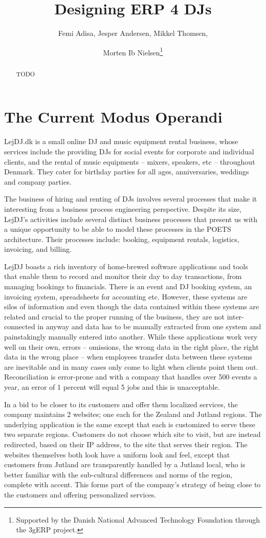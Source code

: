 \documentclass[envcountsame]{llncs}
\title{Designing ERP 4 DJs}
\author{Femi Adisa\inst{1}, Jesper Andersen\inst{2}, Mikkel Thomsen\inst{2}, \and Morten Ib Nielsen\inst{2}\thanks{Supported by the Danish National
    Advanced Technology Foundation through the 3gERP project.}}
\institute{Center for Applied ICT, Copenhagen Business School\\Solbjerg Plads 3 DK-2000,
  Frederiksberg Denmark\and 
  Department of Computer Science, University of Copenhagen\\
  Universitetsparken 1 DK-2100, Copenhagen Denmark\\
  \email{fa.caict@cbs.dk, jespera@diku.dk, jonsson@diku.dk, mortenib@diku.dk}}
\begin{document}
\pagestyle{plain}
\maketitle
\begin{abstract}
TODO
\end{abstract}

\section{The Current Modus Operandi}
\label{sec:curr-modus-oper}

LejDJ.dk is a small online DJ and music equipment rental business,
whose services include the providing DJs for social events for
corporate and individual clients, and the rental of music equipments --
mixers, speakers, etc -- throughout Denmark. They cater for birthday
parties for all ages, anniversaries, weddings and company parties. 

The business of hiring and renting of DJs involves several processes
that make it interesting from a business process engineering
perspective. Despite its size, LejDJ’s activities include several
distinct business processes that present us with a unique opportunity
to be able to model these processes in the POETS architecture. Their
processes include: booking, equipment rentals, logistics, invoicing,
and billing.

LejDJ boasts a rich inventory of home-brewed software applications and
tools that enable them to record and monitor their day to day
transactions, from managing bookings to financials. There is an event
and DJ booking system, an invoicing system, spreadsheets for
accounting etc. However, these systems are silos of information and
even though the data contained within these systems are related and
crucial to the proper running of the business, they are not
inter-connected in anyway and data has to be manually extracted from
one system and painstakingly manually entered into another. While
these applications work very well on their own, errors -- omissions,
the wrong data in the right place, the right data in the wrong place --
when employees transfer data between these systems are inevitable and
in many cases only come to light when clients point them out.
Reconciliation is error-prone and with a company that handles over 500
events a year, an error of 1 percent will equal 5 jobs and this is
unacceptable.

In a bid to be closer to its customers and offer them localized
services, the company maintains 2 websites; one each for the Zealand
and Jutland regions. The underlying application is the same except
that each is customized to serve these two separate regions. Customers
do not choose which site to visit, but are instead redirected, based
on their IP address, to the site that serves their region. The
websites themselves both look have a uniform look and feel, except
that customers from Jutland are transparently handled by a Jutland
local, who is better familiar with the sub-cultural differences and
norms of the region, complete with accent. This forms part of the
company’s strategy of being close to the customers and offering
personalized services.
\end{document}

